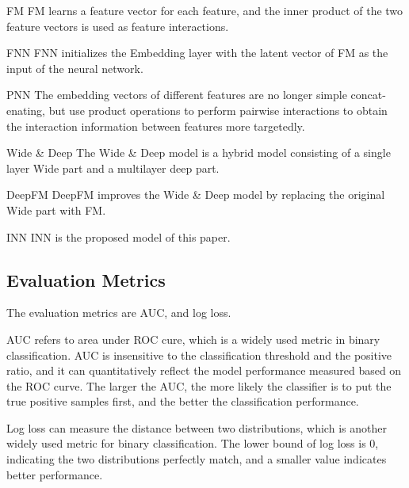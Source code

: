 \documentclass[journal]{IEEEtran}
\begin{document}
FM FM learns a feature vector for each feature, and the inner product of the two feature vectors is used as feature interactions.

FNN FNN initializes the Embedding layer with the latent vector of FM as the input of the neural network.

PNN The embedding vectors of different features are no longer simple concat-enating, but use product operations to perform pairwise interactions to obtain the interaction information between features more targetedly.

Wide \& Deep The Wide \& Deep model is a hybrid model consisting of a single layer Wide part and a multilayer deep part.

DeepFM DeepFM improves the Wide \& Deep model by replacing the original Wide part with FM.

INN INN is the proposed model of this paper.

\subsection{Evaluation Metrics}
The evaluation metrics are AUC, and log loss.

AUC refers to area under ROC cure, which is a widely used metric in binary classification. AUC is insensitive to the classification threshold and the positive ratio, and it can quantitatively reflect the model performance measured based on the ROC curve. The larger the AUC, the more likely the classifier is to put the true positive samples first, and the better the classification performance.

Log loss can measure the distance between two distributions, which is another widely used metric for binary classification. The lower bound of log loss is 0, indicating the two distributions perfectly match, and a smaller value indicates better performance.
\end{document}
